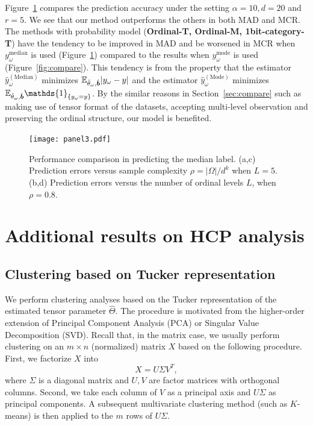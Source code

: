 \documentclass[11pt]{article}
\theoremstyle{plain}
\theoremstyle{definition}
\begin{document}
Figure~\ref{fig:compare2} compares the prediction accuracy under the setting $\alpha = 10, d = 20$ and $r = 5$. We see that our method outperforms the others in both MAD and MCR.  The methods with probability model ({\bf Ordinal-T, Ordinal-M, 1bit-category-T}) have the tendency to be improved in MAD and be worsened in MCR when  $y_\omega^{\text{median}}$ is used (Figure~\ref{fig:compare2}) compared to the results when $y_\omega^{\text{mode}}$ is used (Figure~\ref{fig:compare}). This tendency is from the property that the estimator $\hat y^{(\text{Median})}_\omega$ minimizes $\mathbb{E}_{\hat{\theta}_\omega,\hat{\bm{b}}}|y_\omega-y|$
and the estimator $\hat y^{(\text{Mode})}_\omega $ minimizes $\mathbb{E}_{\hat{\theta}_\omega,\hat{\mb}}\mathds{1}_{\{y_\omega=y\}}$. By the similar reasons in Section~\ref{sec:compare} such as making use of tensor format of the datasets, accepting multi-level observation and preserving the ordinal structure, our model is benefited.



\begin{figure}[H]
  \begin{center}
    \texttt{[image: panel3.pdf]}
  \end{center}
  \caption{Performance comparison in predicting the median label. (a,c) Prediction errors versus sample complexity $\rho=|\Omega|/d^k$ when $L=5$. (b,d) Prediction errors versus the number of ordinal levels $L$, when $\rho=0.8.$}
  \label{fig:compare2}
\end{figure}

\section{Additional results on HCP analysis}
\subsection{Clustering based on Tucker representation}\label{sec:clustering}
We perform clustering analyses based on the Tucker representation of the estimated tensor parameter $\hat\Theta$. The procedure is motivated from the higher-order extension of Principal Component Analysis (PCA) or Singular Value Decomposition (SVD). Recall that, in the matrix case, we usually perform clustering on an $m\times n$ (normalized) matrix $X$ based on the following procedure. First, we factorize $X$ into
\begin{equation}
X = U\Sigma V^T,
\end{equation}
where $\Sigma$ is a diagonal matrix and $ U,V$ are factor matrices with orthogonal columns. Second, we take each column of $V$ as a principal axis and $U\Sigma$ as principal components. A subsequent multivariate clustering method (such as $K$-means) is then applied to the $m$ rows of $U\Sigma$.
\end{document}
